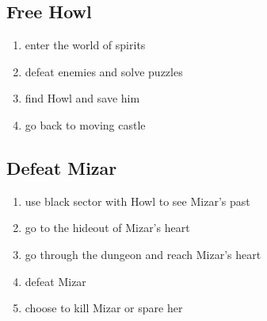 \subsection{Free Howl}
\begin{enumerate}
\item enter the world of spirits
\item defeat enemies and solve puzzles
\item find Howl and save him
\item go back to moving castle
\end{enumerate}

\subsection{Defeat Mizar}
\begin{enumerate}
\item use black sector with Howl to see Mizar’s past
\item go to the hideout of Mizar’s heart
\item go through the dungeon and reach Mizar’s heart
\item defeat Mizar
\item choose to kill Mizar or spare her
\end{enumerate}

